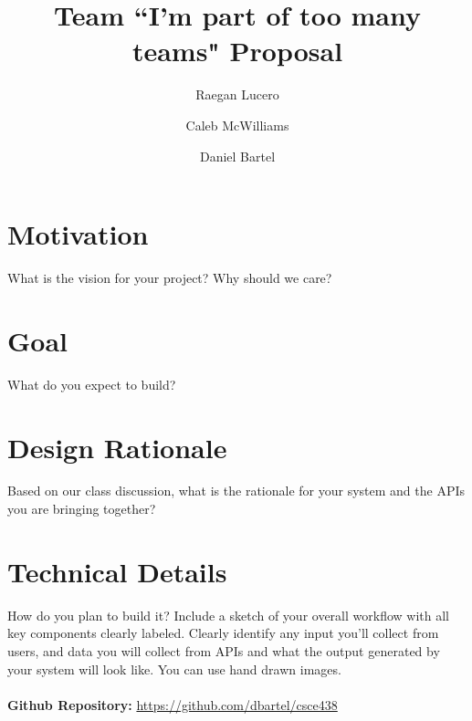 \documentclass{article}
\title{Team ``I'm part of too many teams" Proposal}
\date{}
\author{
	Raegan Lucero
	\and
	 Caleb McWilliams
	\and
	 Daniel Bartel
 }
\begin{document}
\maketitle

\section*{Motivation}
What is the vision for your project? Why should we care?

\section*{Goal}
What do you expect to build?

\section*{Design Rationale}
Based on our class discussion, what is the rationale for your system and the APIs you are bringing together?
	
\section*{Technical Details}
How do you plan to build it? Include a sketch of your overall workflow with all key components clearly labeled. Clearly identify any input you'll collect from users, and data you will collect from APIs and what the output generated by your system will look like. You can use hand drawn images.
\\ \ \\
\textbf{Github Repository:} \url{https://github.com/dbartel/csce438}
\end{document}
